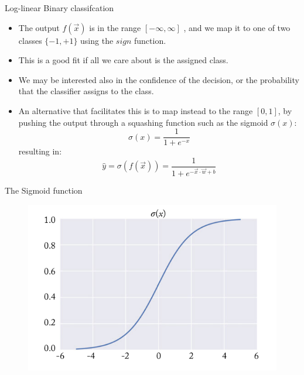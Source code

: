 \documentclass[handout]{beamer}
\begin{document}
\begin{frame}{Log-linear Binary classifcation}
\begin{scriptsize}
\begin{itemize}
\item The output $f(\vec{x})$ is in the range $[-\infty,\infty]$ , and we map it to one of two classes $\{-1,+1\}$ using the $sign$ function.
\item This is a good fit if all we care about is the assigned class.
\item We may be interested also in the confidence of the decision, or the probability that the classifier assigns to the class.
\item An alternative that facilitates this is to map instead to the range $[0,1]$, by pushing the output through a squashing function such as the sigmoid $\sigma(x)$:
\begin{equation}
\sigma(x) = \frac{1}{1+e^{-x}}  
\end{equation}
resulting in: 
\begin{equation}
\hat{y}=\sigma(f(\vec{x})) = \frac{1}{1+e^{-\vec{x}\cdot \vec{w}+b}}  
\end{equation}

\end{itemize}
\end{scriptsize}
\end{frame}


\begin{frame}{The Sigmoid function}
\begin{figure}[htb]
	\centering
	 \includegraphics[scale=0.5]{pics/sigmoid.png}
\end{figure}
\end{frame}
\end{document}
